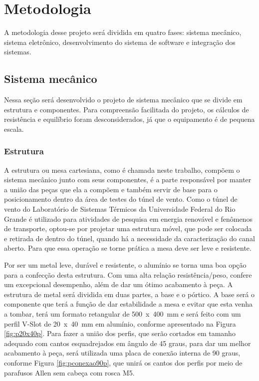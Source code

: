 \chapter{Metodologia}\label{ch:metodologia}

A metodologia desse projeto será dividida em quatro fases: sistema mecânico, sistema eletrônico, 
desenvolvimento do sistema de software e integração dos sistemas.

\section{Sistema mecânico}\label{sec:metmecanico}

Nessa seção será desenvolvido o projeto de sistema mecânico que se divide em estrutura e componentes. 
Para compreensão facilitada do projeto, os cálculos de resistência e equilíbrio foram desconsiderados, 
já que o equipamento é de pequena escala.

\subsection{Estrutura}\label{subsec:metestrutura}

A estrutura ou mesa cartesiana, como é chamada neste trabalho, compõem o sistema mecânico junto com seus 
componentes, é a parte responsável por manter a união das peças que ela a compõem e também servir de base 
para o posicionamento dentro da área de testes do túnel de vento. Como o túnel de vento do Laboratório de 
Sistemas Térmicos da Universidade Federal do Rio Grande é utilizado para atividades de pesquisa em energia 
renovável e fenômenos de transporte, optou-se por projetar uma estrutura móvel, que pode ser colocada e 
retirada de dentro do túnel, quando há a necessidade da caracterização do canal aberto. Para que essa 
operação se torne prática a mesa deve ser leve e resistente.

Por ser um metal leve, durável e resistente, o alumínio se torna uma boa opção para a confecção desta 
estrutura. Com uma alta relação resistência/peso, confere um excepcional desempenho, além de dar um ótimo 
acabamento à peça. A estrutura de metal será dividida em duas partes, a base e o pórtico. A base será 
o componente que terá a função de dar estabilidade a mesa e evitar que esta venha a tombar, terá um 
formato retangular de 500~x~400~mm e será feito com um perfil V-Slot de 20~x~40~mm em alumínio, conforme 
apresentado na Figura \ref{fig:p20x40p}. 
Para fazer a união dos perfis, que serão cortados em tamanho adequado com cantos esquadrejados em 
ângulo de 45 graus, para dar um melhor acabamento à peça, será utilizada uma placa de conexão 
interna de 90 graus, conforme Figura \ref{fig:pconexao90p}, que unirá os cantos dos perfis por 
meio de parafusos Allen sem cabeça com rosca M5.
    
